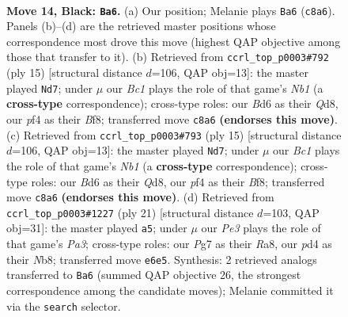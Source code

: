 \documentclass[11pt]{article}
\begin{document}
\clearpage

\begin{figure}[p]\centering
\begin{subfigure}{0.46\textwidth}\centering
\resizebox{\linewidth}{!}{%
\newchessgame
\chessboard[
  setfen={r1b4r/p2nkppp/2pbpn2/q7/Np1P1PPN/3BP3/PP5P/R1BQ1RK1 b - - 0 14},
  showmover=false,
  pgfstyle=straightmove, color=movearrow, markmove={c8-a6}
]}
\caption{}
\end{subfigure}\hfill
\begin{subfigure}{0.46\textwidth}\centering
\resizebox{\linewidth}{!}{%
\newchessgame
\chessboard[
  setfen={rn1qkb1r/pp3ppp/3pp3/2pP3b/4n3/2P2N1P/PP2BPP1/RNBQ1RK1 b kq - 0 8},
  showmover=false,
  pgfstyle=straightmove, color=movearrow, markmove={b8-d7}
]}
\caption{}
\end{subfigure}
\\[4pt]
\begin{subfigure}{0.46\textwidth}\centering
\resizebox{\linewidth}{!}{%
\newchessgame
\chessboard[
  setfen={rn1qkb1r/pp3ppp/3pp3/2pP3b/4n3/2P2N1P/PP2BPP1/RNBQ1RK1 b kq - 0 8},
  showmover=false,
  pgfstyle=straightmove, color=movearrow, markmove={b8-d7}
]}
\caption{}
\end{subfigure}\hfill
\begin{subfigure}{0.46\textwidth}\centering
\resizebox{\linewidth}{!}{%
\newchessgame
\chessboard[
  setfen={rn1qkb1r/5pp1/p2pbn2/3Np2p/Pp2P3/6PP/1PP1NPB1/R1BQK2R b KQkq - 1 11},
  showmover=false,
  pgfstyle=straightmove, color=movearrow, markmove={a6-a5}
]}
\caption{}
\end{subfigure}
\caption{\textbf{Move 14, Black: \texttt{Ba6}.} (a) Our position; Melanie plays \texttt{Ba6} (\texttt{c8a6}). Panels (b)--(d) are the retrieved master positions whose correspondence most drove this move (highest QAP objective among those that transfer to it). (b) Retrieved from \texttt{ccrl\_top\_p0003\#792} (ply 15) [structural distance $d$=106, QAP obj=13]: the master played \texttt{Nd7}; under $\mu$ our \emph{Bc1} plays the role of that game's \emph{Nb1} (a \textbf{cross-type} correspondence); cross-type roles: our \emph{B}d6 as their \emph{Q}d8, our \emph{p}f4 as their \emph{B}f8; transferred move \texttt{c8a6} \textbf{(endorses this move)}. (c) Retrieved from \texttt{ccrl\_top\_p0003\#793} (ply 15) [structural distance $d$=106, QAP obj=13]: the master played \texttt{Nd7}; under $\mu$ our \emph{Bc1} plays the role of that game's \emph{Nb1} (a \textbf{cross-type} correspondence); cross-type roles: our \emph{B}d6 as their \emph{Q}d8, our \emph{p}f4 as their \emph{B}f8; transferred move \texttt{c8a6} \textbf{(endorses this move)}. (d) Retrieved from \texttt{ccrl\_top\_p0003\#1227} (ply 21) [structural distance $d$=103, QAP obj=31]: the master played \texttt{a5}; under $\mu$ our \emph{Pe3} plays the role of that game's \emph{Pa3}; cross-type roles: our \emph{P}g7 as their \emph{R}a8, our \emph{p}d4 as their \emph{N}b8; transferred move \texttt{e6e5}. Synthesis: 2 retrieved analogs transferred to \texttt{Ba6} (summed QAP objective 26, the strongest correspondence among the candidate moves); Melanie committed it via the \texttt{search} selector.}
\label{fig:thought-m27}
\end{figure}
\end{document}
